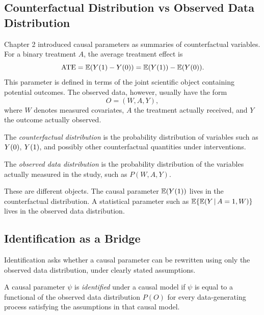 \label{lec:3-1}

\subsection{Counterfactual Distribution vs Observed Data Distribution}

Chapter 2 introduced causal parameters as summaries of counterfactual variables. For a binary treatment $A$, the average treatment effect is
\[
\operatorname{ATE}=\mathbb{E}(Y(1)-Y(0))=\mathbb{E}(Y(1))-\mathbb{E}(Y(0)).
\]
This parameter is defined in terms of the joint scientific object containing potential outcomes. The observed data, however, usually have the form
\[
O=(W,A,Y),
\]
where $W$ denotes measured covariates, $A$ the treatment actually received, and $Y$ the outcome actually observed.

\begin{definition}
The \emph{counterfactual distribution} is the probability distribution of variables such as $Y(0)$, $Y(1)$, and possibly other counterfactual quantities under interventions.
\end{definition}

\begin{definition}
The \emph{observed data distribution} is the probability distribution of the variables actually measured in the study, such as $P(W,A,Y)$.
\end{definition}

These are different objects. The causal parameter $\mathbb{E}(Y(1))$ lives in the counterfactual distribution. A statistical parameter such as $\mathbb{E}\{\mathbb{E}(Y\,\vert\, A=1,W)\}$ lives in the observed data distribution.

\subsection{Identification as a Bridge}

Identification asks whether a causal parameter can be rewritten using only the observed data distribution, under clearly stated assumptions.

\begin{definition}
A causal parameter $\psi$ is \emph{identified} under a causal model if $\psi$ is equal to a functional of the observed data distribution $P(O)$ for every data-generating process satisfying the assumptions in that causal model.
\end{definition}

